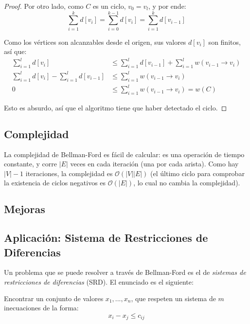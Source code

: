 \documentclass[a4paper]{report}
\newcommand{\BigO}[1]{\ensuremath{\mathcal{O}(#1)}}
\begin{document}
\begin{proof}
    Por otro lado, como $C$ es un ciclo, $v_0 = v_l$, y por ende:
    $$\sum_{i = 1}^k d[v_i] = \sum_{i = 0}^{k - 1} d[v_i] = \sum_{i = 1}^k d[v_{i - 1}]$$

    Como los vértices son alcanzables desde el origen, sus valores $d[v_i]$ son finitos, así que:
    \begin{align*}
        \sum_{i = 1}^l d[v_i]                               & \leq \sum_{i = 1}^l d[v_{i - 1}] + \sum_{i = 1}^l w(v_{i - 1} \rightarrow v_i) \\
        \sum_{i = 1}^l d[v_i] - \sum_{i = 1}^l d[v_{i - 1}] & \leq \sum_{i = 1}^l w(v_{i - 1} \rightarrow v_i)                               \\
        0                                                   & \leq \sum_{i = 1}^l w(v_{i - 1} \rightarrow v_i) = w(C)
    \end{align*}

    Esto es absurdo, así que el algoritmo tiene que haber detectado el ciclo.

\end{proof}

\subsection{Complejidad}

La complejidad de Bellman-Ford es fácil de calcular:  es una operación de tiempo constante, y corre $|E|$ veces en cada iteración (una por cada arista). Como hay $|V| - 1$ iteraciones, la complejidad es \BigO{|V||E|} (el último ciclo para comprobar la existencia de ciclos negativos es \BigO{|E|}, lo cual no cambia la complejidad).

\subsection{Mejoras}


\subsection{Aplicación: Sistema de Restricciones de Diferencias}

Un problema que se puede resolver a través de Bellman-Ford es el de \textit{sistemas de restricciones de diferencias} (SRD). El enunciado es el siguiente:

\begin{problema}
    Encontrar un conjunto de valores $x_1, ..., x_n$, que respeten un sistema de $m$ inecuaciones de la forma:
    $$x_i - x_j \leq c_{ij}$$
\end{problema}
\end{document}
